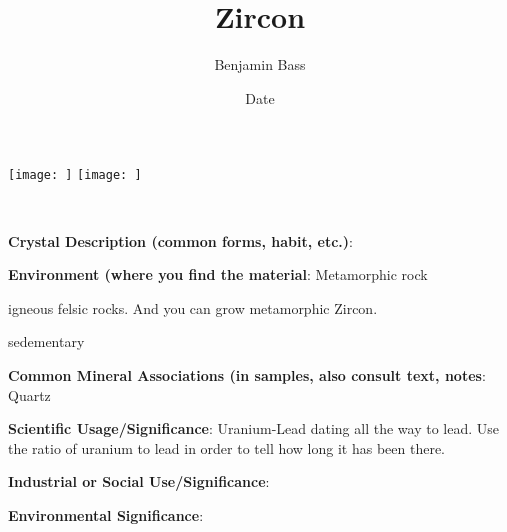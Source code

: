 \documentclass[10pt]{article}
\author{Benjamin Bass}
\date{Date}
\title{\vspace{-2.0cm}Zircon} %
\begin{document}
\maketitle


\begin{center}
  \texttt{[image: ]}
  \texttt{[image: ]}
\end{center}



\
\
\
\
\
\
\
\
\
\

\begin{framed}
  \textbf{Crystal Description (common forms, habit, etc.)}: 
\end{framed}

\begin{framed}
  \textbf{Environment (where you find the material}: Metamorphic rock

igneous felsic rocks. And you can grow metamorphic Zircon.

sedementary
\end{framed}

\begin{framed}
  \textbf{Common Mineral Associations (in samples, also consult text, notes}: Quartz
\end{framed}

\begin{framed}
  \textbf{Scientific Usage/Significance}: Uranium-Lead dating all the way to lead. Use the ratio of uranium to lead in order to tell how long it has been there.
\end{framed}

\begin{framed}
  \textbf{Industrial or Social Use/Significance}: 
\end{framed}

\begin{framed}
  \textbf{Environmental Significance}: 
\end{framed}

\end{document}
